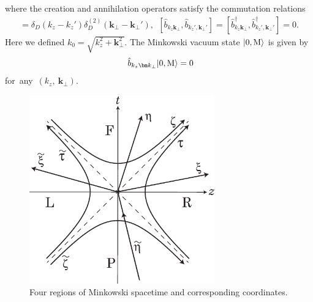 \documentclass[aps,prd,preprintnumbers,nofootinbib,showpacs]{revtex4}%
\begin{document}
\begin{widetext}
where the creation and annihilation operators satisfy the commutation relations
\begin{eqnarray}
[{\hat b}_{k_z\bm k_\perp}, {\hat b}_{k_z',\bm k_\perp'}^\dagger]=\delta_D(k_z-k_z') \delta_D^{(2)}(\bm k_\perp-\bm k_\perp'), 
~~
[{\hat b}_{k_z\bm k_\perp}, {\hat b}_{k_z',\bm k_\perp'}]=[{\hat b}_{k_z\bm k_\perp}^\dagger, {\hat b}_{k_z',\bm k_\perp'}^\dagger]=0. 
\end{eqnarray}
Here we defined $k_0=\sqrt{k_z^2+\bm k_\perp^2}$.
The Minkowski vacuum state $|0,{\rm M}\rangle$ is given by 
\begin{eqnarray}
&&\hat b_{k_z\bm k_\perp}|0,{\rm M}\rangle=0 ~~
\label{fourdvacuum}
\end{eqnarray}
for~any~$(k_z,~\bm k_\perp)$.


\begin{figure}[t]
\begin{center}
    \includegraphics[width=8cm]{fig1.eps}
\caption{Four regions of Minkowski spacetime and corresponding coordinates.
\label{fig:coordinate}}
\end{center}
\end{figure}


\end{widetext}
\end{document}
